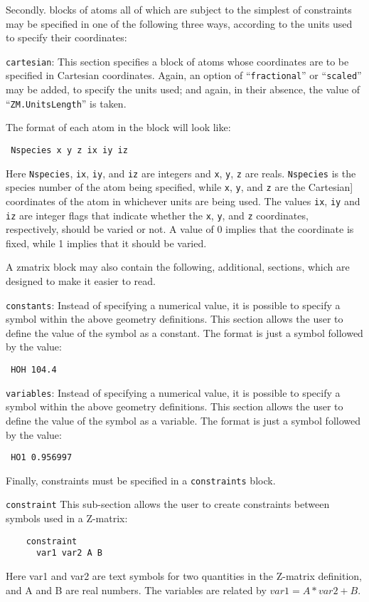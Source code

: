 \documentclass[11pt]{article}
\begin{document}
\begin{description}
Secondly. blocks of atoms all of which are subject to the simplest of constraints
may be specified in one of the following three ways, according to the units used
to specify their coordinates:


\item \texttt{cartesian}: This section specifies a block of atoms whose coordinates are to be
specified in Cartesian coordinates. Again, an option of ``\texttt{fractional}'' or ``\texttt{scaled}''
may be added, to specify the units used; and again, in their absence, the value of 
``\texttt{ZM.UnitsLength}'' is taken.

The format of each atom in the block will look like:

\noindent\texttt{      Nspecies x y z ix iy iz}

Here \texttt{Nspecies}, \texttt{ix}, \texttt{iy}, and \texttt{iz} are integers and \texttt{x}, \texttt{y}, \texttt{z} are reals. \texttt{Nspecies} is the
species number of the atom being specified, while \texttt{x}, \texttt{y}, and \texttt{z} are the Cartesian]
coordinates of the atom in whichever units are being used. The values \texttt{ix}, \texttt{iy} and \texttt{iz} 
are integer flags that indicate whether the \texttt{x}, \texttt{y}, and \texttt{z} coordinates, respectively,
should be varied or not. A value of 0 implies that the coordinate is fixed, while 1 implies that it should be varied.

A zmatrix block may also contain the following, additional, sections, which
are designed to make it easier to read.

\item \texttt{constants}: Instead of specifying a numerical value, it is possible to specify a symbol
within the above geometry definitions. This section allows the user to define the value
of the symbol as a constant. The format is just a symbol followed by the value:

\noindent\texttt{      HOH 104.4}

\item \texttt{variables}: Instead of specifying a numerical value, it is possible to specify a symbol
within the above geometry definitions. This section allows the user to define the value
of the symbol as a variable. The format is just a symbol followed by the value:

\noindent\texttt{      HO1 0.956997}

Finally, constraints must be specified in a \texttt{constraints} block.

\item \texttt{constraint} This sub-section allows the user to create constraints between symbols used
in a Z-matrix:
\begin{verbatim}
    constraint
      var1 var2 A B
\end{verbatim}
Here var1 and var2 are text symbols for two quantities in the Z-matrix definition, and A
and B are real numbers. The variables are related by $var1 = A*var2 + B$.


\end{description}
\end{document}
